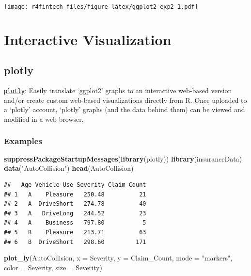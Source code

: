 \documentclass[]{book}
\newenvironment{Shaded}{\begin{snugshade}}{\end{snugshade}}
\newcommand{\KeywordTok}[1]{\textcolor[rgb]{0.13,0.29,0.53}{\textbf{{#1}}}}
\newcommand{\DataTypeTok}[1]{\textcolor[rgb]{0.13,0.29,0.53}{{#1}}}
\newcommand{\StringTok}[1]{\textcolor[rgb]{0.31,0.60,0.02}{{#1}}}
\newcommand{\NormalTok}[1]{{#1}}
\begin{document}
\texttt{[image: r4fintech\_files/figure-latex/ggplot2-exp2-1.pdf]}

\section{\texorpdfstring{\textbf{Interactive
Visualization}}{Interactive Visualization}}\label{interactive-visualization}

\subsection{\texorpdfstring{\textbf{plotly}}{plotly}}\label{plotly}

\href{https://cran.r-project.org/web/packages/plotly/index.html}{\texttt{plotly}}:
Easily translate `ggplot2' graphs to an interactive web-based version
and/or create custom web-based visualizations directly from R. Once
uploaded to a `plotly' account, `plotly' graphs (and the data behind
them) can be viewed and modified in a web browser.

\subsubsection{\texorpdfstring{\textbf{Examples}}{Examples}}\label{examples-14}

\begin{Shaded}
\begin{Highlighting}[]
\KeywordTok{suppressPackageStartupMessages}\NormalTok{(}\KeywordTok{library}\NormalTok{(plotly))}
\KeywordTok{library}\NormalTok{(insuranceData)}
\KeywordTok{data}\NormalTok{(}\StringTok{"AutoCollision"}\NormalTok{)}
\KeywordTok{head}\NormalTok{(AutoCollision)}
\end{Highlighting}
\end{Shaded}

\begin{verbatim}
##   Age Vehicle_Use Severity Claim_Count
## 1   A    Pleasure   250.48          21
## 2   A  DriveShort   274.78          40
## 3   A   DriveLong   244.52          23
## 4   A    Business   797.80           5
## 5   B    Pleasure   213.71          63
## 6   B  DriveShort   298.60         171
\end{verbatim}

\begin{Shaded}
\begin{Highlighting}[]
\KeywordTok{plot_ly}\NormalTok{(AutoCollision, }\DataTypeTok{x =} \NormalTok{Severity, }\DataTypeTok{y =} \NormalTok{Claim_Count, }\DataTypeTok{mode =} \StringTok{"markers"}\NormalTok{, }
        \DataTypeTok{color =} \NormalTok{Severity, }\DataTypeTok{size =} \NormalTok{Severity)}
\end{Highlighting}
\end{Shaded}
\end{document}
